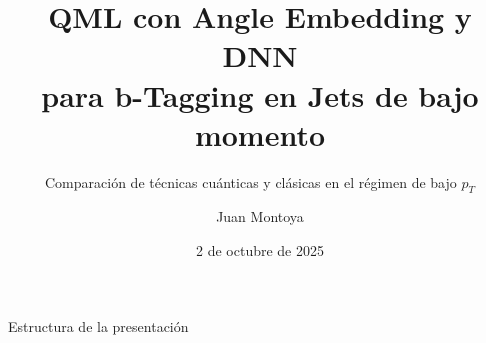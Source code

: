 \documentclass[aspectratio=169]{beamer}
\title[QML para b-Tagging]{QML con Angle Embedding y DNN\\para b-Tagging en Jets de bajo momento}
\subtitle{Comparación de técnicas cuánticas y clásicas en el régimen de bajo \texorpdfstring{$p_T$}{pT}}
\author[J. Montoya]{Juan Montoya}
\institute[Instituto de Física]{
  Instituto de Física\\
  Universidad de Antioquia
}
\date{2 de octubre de 2025}
\begin{document}
\begin{frame}
  \titlepage
\end{frame}

\begin{frame}{Estructura de la presentación}
  \tableofcontents
\end{frame}
\end{document}
